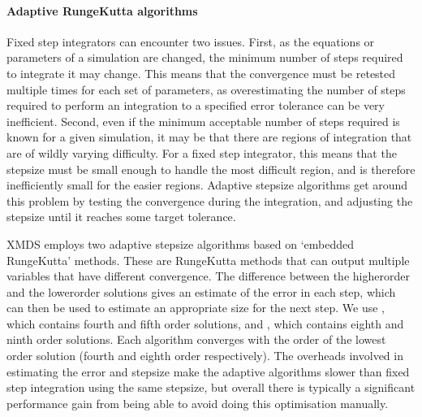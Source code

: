 \documentclass[letterpaper,10pt,english]{sphinxmanual}
\begin{document}
\ignorespaces 

\paragraph{Adaptive Runge\sphinxhyphen{}Kutta algorithms}
\label{\detokenize{reference_elements:adaptive-runge-kutta-algorithms}}\label{\detokenize{reference_elements:ark45}}\label{\detokenize{reference_elements:index-84}}
\sphinxAtStartPar
Fixed step integrators can encounter two issues.  First, as the equations or parameters of a simulation are changed, the minimum number of steps required to integrate it may change.  This means that the convergence must be re\sphinxhyphen{}tested multiple times for each set of parameters, as overestimating the number of steps required to perform an integration to a specified error tolerance can be very inefficient. Second, even if the minimum acceptable number of steps required is known for a given simulation, it may be that there are regions of integration that are of wildly varying difficulty.  For a fixed step integrator, this means that the step\sphinxhyphen{}size must be small enough to handle the most difficult region, and is therefore inefficiently small for the easier regions.  Adaptive step\sphinxhyphen{}size
algorithms get around this problem by testing the convergence during the integration, and adjusting the step\sphinxhyphen{}size until it reaches some target tolerance.

\sphinxAtStartPar
XMDS employs two adaptive step\sphinxhyphen{}size algorithms based on ‘embedded Runge\sphinxhyphen{}Kutta’ methods.  These are Runge\sphinxhyphen{}Kutta methods that can output multiple variables that have different convergence.  The difference between the higher\sphinxhyphen{}order and the lower\sphinxhyphen{}order solutions gives an estimate of the error in each step, which can then be used to estimate an appropriate size for the next step.  We use , which contains fourth and fifth order solutions, and , which contains eighth and ninth order solutions.  Each algorithm converges with the order of the lowest order solution (fourth and eighth order respectively).  The overheads involved in estimating the error and step\sphinxhyphen{}size make the adaptive algorithms slower than fixed step integration using the same step\sphinxhyphen{}size, but overall there is typically a significant performance gain from being able to avoid doing this optimisation manually.
\end{document}
